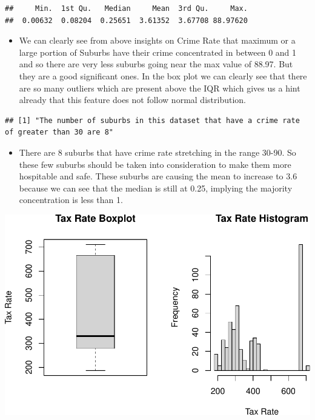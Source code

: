 \documentclass[
]{article}
\providecommand{\tightlist}{%
  \setlength{\itemsep}{0pt}\setlength{\parskip}{0pt}}
\begin{document}
\begin{verbatim}
##     Min.  1st Qu.   Median     Mean  3rd Qu.     Max. 
##  0.00632  0.08204  0.25651  3.61352  3.67708 88.97620
\end{verbatim}

\begin{itemize}
\tightlist
\item
  We can clearly see from above insights on Crime Rate that maximum or a
  large portion of Suburbs have their crime concentrated in between 0
  and 1 and so there are very less suburbs going near the max value of
  88.97. But they are a good significant ones. In the box plot we can
  clearly see that there are so many outliers which are present above
  the IQR which gives us a hint already that this feature does not
  follow normal distribution.
\end{itemize}

\begin{verbatim}
## [1] "The number of suburbs in this dataset that have a crime rate of greater than 30 are 8"
\end{verbatim}

\begin{itemize}
\tightlist
\item
  There are 8 suburbs that have crime rate stretching in the range
  30-90. So these few suburbs should be taken into consideration to make
  them more hospitable and safe. These suburbs are causing the mean to
  increase to 3.6 because we can see that the median is still at 0.25,
  implying the majority concentration is less than 1.
\end{itemize}

\begin{center}\includegraphics{Disha_Gandhi_Take_Home_Exam_PDF_files/figure-latex/unnamed-chunk-10-1} \end{center}
\end{document}
